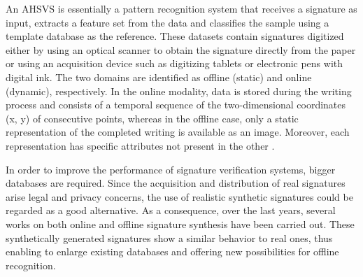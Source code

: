 An AHSVS is essentially a pattern recognition system that receives a signature as input, extracts a feature set from the data and classifies the sample using a template database as the reference. These datasets contain signatures digitized either by using an optical scanner to obtain the signature directly from the paper or using an acquisition device such as digitizing tablets or electronic pens with digital ink. The two domains are identified as offline (static) and online (dynamic), respectively.  In the online modality, data is stored during the writing process and consists of a temporal sequence of the two-dimensional coordinates (x, y) of consecutive points, whereas in the offline case, only a static representation of the completed writing is available as an image. Moreover, each representation has specific attributes not present in the other \cite{viard1999ireste}. 

In order to improve the performance of signature verification systems, bigger databases are required. Since the acquisition and distribution of real signatures arise legal and privacy concerns, the use of realistic synthetic signatures could be regarded as a good alternative. As a consequence, over the last years, several works on both online \cite{galbally2009synthetic, galbally2012synthetic} and offline \cite{ferrer2013synthetic, ferrer2013realistic} signature synthesis have been carried out. These synthetically generated signatures show a similar behavior to real ones, thus enabling to enlarge existing databases and offering new possibilities for offline recognition.




